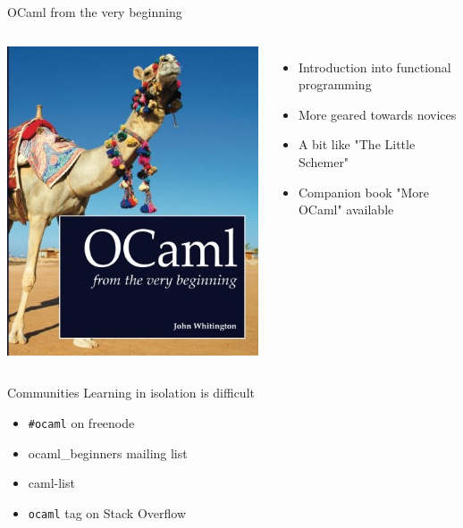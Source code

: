 \documentclass{beamer}
\begin{document}
\begin{frame}{OCaml from the very beginning}
  \begin{columns}[c]
      \includegraphics[height=0.8\textheight]{very-beginning}
      \begin{itemize}
        \item Introduction into functional programming
        \item More geared towards novices
        \item A bit like "The Little Schemer"
        \item Companion book "More OCaml" available
      \end{itemize}
  \end{columns}
\end{frame}

\begin{frame}{Communities}
  Learning in isolation is difficult
  \begin{itemize}
    \item \texttt{\#ocaml} on freenode
    \item ocaml\_beginners mailing list
    \item caml-list
    \item \texttt{ocaml} tag on Stack Overflow
  \end{itemize}
\end{frame}
\end{document}
